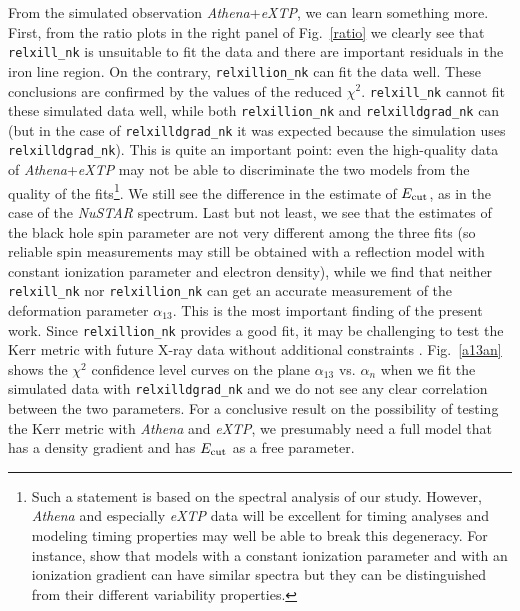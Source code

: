 \documentclass[twocolumn]{emulateapj}
\begin{document}
From the simulated observation \textsl{Athena}+\textsl{eXTP}, we can learn something more. First, from the ratio plots in the right panel of Fig.~\ref{ratio} we clearly see that {\tt relxill\_nk} is unsuitable to fit the data and there are important residuals in the iron line region. On the contrary, {\tt relxillion\_nk} can fit the data well. These conclusions are confirmed by the values of the reduced $\chi^2$. {\tt relxill\_nk} cannot fit these simulated data well, while both {\tt relxillion\_nk} and {\tt relxilldgrad\_nk} can (but in the case of {\tt relxilldgrad\_nk} it was expected because the simulation uses {\tt relxilldgrad\_nk}). This is quite an important point: even the high-quality data of \textsl{Athena}+\textsl{eXTP} may not be able to discriminate the two models from the quality of the fits\footnote{Such a statement is based on the spectral analysis of our study. However, \textsl{Athena} and especially \textsl{eXTP} data will be excellent for timing analyses and modeling timing properties may well be able to break this degeneracy. For instance, \citet{2019MNRAS.488..324I} show that models with a constant ionization parameter and with an ionization gradient can have similar spectra but they can be distinguished from their different variability properties.}.
We still see the difference in the estimate of $E_{\rm cut}$, as in the case of the \textsl{NuSTAR} spectrum. Last but not least, we see that the estimates of the black hole spin parameter are not very different among the three fits (so reliable spin measurements may still be obtained with a reflection model with constant ionization parameter and electron density), while we find that neither {\tt relxill\_nk} nor {\tt relxillion\_nk} can get an accurate measurement of the deformation parameter $\alpha_{13}$. This is the most important finding of the present work. Since {\tt relxillion\_nk} provides a good fit, it may be challenging to test the Kerr metric with future X-ray data without additional constraints \citep[e.g., study of the timing properties, see][]{2019MNRAS.488..324I}. Fig.~\ref{a13an} shows the $\chi^2$ confidence level curves on the plane $\alpha_{13}$ vs. $\alpha_n$ when we fit the simulated data with {\tt relxilldgrad\_nk} and we do not see any clear correlation between the two parameters. For a conclusive result on the possibility of testing the Kerr metric with \textsl{Athena} and \textsl{eXTP}, we presumably need a full model that has a density gradient and has $E_{\rm cut}$ as a free parameter.
\end{document}
